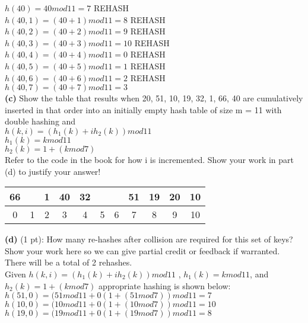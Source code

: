 \documentclass[12pt]{article}
\begin{document}
$h(40) = 40 mod 11 = 7$ REHASH \\
$h(40, 1) = (40 + 1) mod 11 = 8$ REHASH \\
$h(40, 2) = (40 + 2) mod 11 = 9$ REHASH \\
$h(40, 3) = (40 + 3) mod 11 = 10$ REHASH \\
$h(40, 4) = (40 + 4) mod 11 = 0 $ REHASH \\
$h(40, 5) = (40 + 5) mod 11 = 1$ REHASH \\
$h(40, 6) = (40 + 6) mod 11 = 2$ REHASH \\
$h(40, 7) = (40 + 7) mod 11 = 3$ \\
\linebreak
\textbf{(c)} Show the table that results when 20, 51, 10, 19, 32, 1, 66, 40 are cumulatively inserted in that order into an initially empty hash table of size m = 11 with double hashing and \\
$h(k, i) = (h_1(k) + ih_2(k)) mod 11$ \\
$h_1(k) = k mod 11$ \\
$h_2(k) = 1 + (k mod 7)$ \\
Refer to the code in the book for how i is incremented. Show your work in part (d) to justify your answer! \\
\linebreak
\begin{center}
\begin{tabular}{c|c|c|c|c|c|c|c|c|c|c}
\hline
66 &  & 1 & 40 & 32 &  &  & 51 & 19 & 20 & 10 \\
\hline
0 & 1 & 2 & 3 & 4 & 5 & 6 & 7 & 8 & 9 & 10 \\
\end{tabular}
\end{center}
\linebreak
\textbf{(d)} (1 pt): How many re-hashes after collision are required for this set of keys? Show your work here so we can give partial credit or feedback if warranted. \\
\linebreak
There will be a total of 2 rehashes. \\
Given $h(k, i) = (h_1(k) + ih_2(k)) mod 11$ , $h_1(k) = k mod 11$,  and $h_2(k) = 1 + (k mod 7)$ appropriate hashing is shown below: \\
\linebreak
$h(51, 0) = (51 mod 11 + 0(1 + (51 mod 7)) mod 11 = 7$ \\
$h(10, 0) = (10 mod 11 + 0(1 + (10 mod 7)) mod 11 = 10$ \\
$h(19, 0) = (19 mod 11 + 0(1 + (19 mod 7)) mod 11 = 8$ \\
\end{document}
